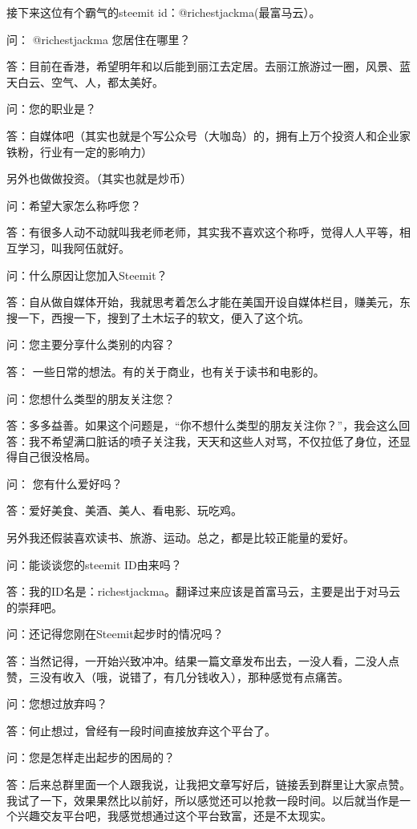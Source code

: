 \documentclass[]{ctexbook}
\begin{document}
接下来这位有个霸气的steemit id：@richestjackma(最富马云）。

问： @richestjackma 您居住在哪里？

答：目前在香港，希望明年和以后能到丽江去定居。去丽江旅游过一圈，风景、蓝天白云、空气、人，都太美好。

问：您的职业是？

答：自媒体吧（其实也就是个写公众号（大咖岛）的，拥有上万个投资人和企业家铁粉，行业有一定的影响力）

另外也做做投资。（其实也就是炒币）

问：希望大家怎么称呼您？

答：有很多人动不动就叫我老师老师，其实我不喜欢这个称呼，觉得人人平等，相互学习，叫我阿伍就好。

问：什么原因让您加入Steemit？

答：自从做自媒体开始，我就思考着怎么才能在美国开设自媒体栏目，赚美元，东搜一下，西搜一下，搜到了土木坛子的软文，便入了这个坑。

问：您主要分享什么类别的内容？

答： 一些日常的想法。有的关于商业，也有关于读书和电影的。

问：您想什么类型的朋友关注您？

答：多多益善。如果这个问题是，``你不想什么类型的朋友关注你？''，我会这么回答：我不希望满口脏话的喷子关注我，天天和这些人对骂，不仅拉低了身位，还显得自己很没格局。

问： 您有什么爱好吗？

答：爱好美食、美酒、美人、看电影、玩吃鸡。

另外我还假装喜欢读书、旅游、运动。总之，都是比较正能量的爱好。

问：能谈谈您的steemit ID由来吗？

答：我的ID名是：richestjackma。翻译过来应该是首富马云，主要是出于对马云的崇拜吧。

问：还记得您刚在Steemit起步时的情况吗？

答：当然记得，一开始兴致冲冲。结果一篇文章发布出去，一没人看，二没人点赞，三没有收入（哦，说错了，有几分钱收入），那种感觉有点痛苦。

问：您想过放弃吗？

答：何止想过，曾经有一段时间直接放弃这个平台了。

问：您是怎样走出起步的困局的？

答：后来总群里面一个人跟我说，让我把文章写好后，链接丢到群里让大家点赞。我试了一下，效果果然比以前好，所以感觉还可以抢救一段时间。以后就当作是一个兴趣交友平台吧，我感觉想通过这个平台致富，还是不太现实。
\end{document}
